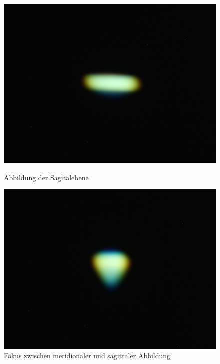 \begin{figure}[htb]
	\begin{minipage}[t]{0.48\textwidth}
		\includegraphics[width=\linewidth]{img/Astigmatismus/Prakt_Linsenfehler_2015_06_04_087_saggital}
		\caption{Abbildung der Sagitalebene}
		\label{fig:astigmatismus_sagittal}
	\end{minipage}
	\hfill
	\begin{minipage}[t]{0.48\textwidth}
		\includegraphics[width=\linewidth]{img/Astigmatismus/Prakt_Linsenfehler_2015_06_04_089_mittenfokus}
		\caption{Fokus zwischen meridionaler und sagittaler Abbildung}
		\label{fig:astigmatismus_mittenfokus}
	\end{minipage}
\end{figure}

